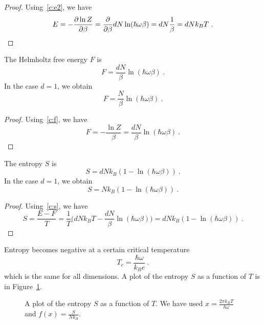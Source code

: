     \begin{proof}
        Using~\eqref{c:e2}, we have
        \begin{equation*}
            E = - \frac{\partial\ln Z}{\partial\beta} = \frac{\partial}{\partial\beta} d N \ln (\hbar \omega \beta) = d N \frac{1}{\beta} = d N k_B T ~.
        \end{equation*}
    \end{proof}
    The Helmholtz free energy $F$ is 
    \begin{equation*}
        F = \frac{dN}{\beta} \ln (\hbar \omega \beta) ~.
    \end{equation*}
    In the case $d = 1$, we obtain 
    \begin{equation*}
        F = \frac{N}{\beta} \ln (\hbar \omega \beta) ~.
    \end{equation*}
    \begin{proof}
        Using~\eqref{c:f}, we have
        \begin{equation*}
            F = - \frac{\ln Z}{\beta} = \frac{dN}{\beta} \ln (\hbar \omega \beta) ~.
        \end{equation*}
    \end{proof}
    The entropy $S$ is 
    \begin{equation*}
        S = d N k_B (1 - \ln (\hbar \omega \beta)) ~.
    \end{equation*}
    In the case $d=1$, we obtain 
    \begin{equation*}
        S = N k_B (1 - \ln (\hbar \omega \beta)) ~.
    \end{equation*}
    \begin{proof}
        Using~\eqref{c:s}, we have
        \begin{equation*}
            S = \frac{E - F}{T} = \frac{1}{T} \Big ( d N k_B T - \frac{dN}{\beta} \ln (\hbar \omega \beta) \Big ) = d N k_B (1 - \ln (\hbar \omega \beta)) ~.
        \end{equation*}
    \end{proof}
    Entropy becomes negative at a certain critical temperature
    \begin{equation}\label{ex:negs2}
        T_c = \frac{\hbar \omega}{k_B e} ~.
    \end{equation}
    which is the same for all dimensions.
    A plot of the entropy $S$ as a function of $T$ is in Figure~\ref{fig:c:ent2}.
    \begin{figure}
        \centering
        \caption{A plot of the entropy $S$ as a function of $T$. We have used $x = \frac{2 \pi k_B T}{h \omega}$ and $f(x) = \frac{S}{N k_B}$.}
        \label{fig:c:ent2}
    \end{figure}
